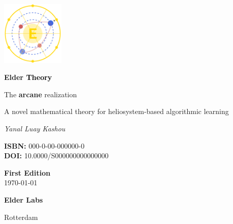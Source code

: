 \documentclass[11pt,twoside]{book}
\begin{document}
\frontmatter

\begin{titlepage}
    \centering
    \vspace*{0.5cm}
    \includegraphics[width=3cm]{figures/elder_symbol.pdf}
    \vspace{0.5cm}
    
    {\Huge\bfseries \textcolor{DarkSkyBlue}{Elder }\textrm{\textcolor{black}{Theory}}\par}
    \vspace{0.8cm}
    {\Large The \textcolor{DarkSkyBlue}{\textbf{arcane}} realization\par}
    \vspace{0.3cm}
    {\large A novel mathematical theory for heliosystem-based algorithmic learning\par}
    
    \vspace{3cm}
    {\Large\itshape Yanal Luay Kashou\par}

    \vfill
    
    \begin{minipage}{0.4\textwidth}
        \begin{flushleft}
            \textbf{ISBN:} 000-0-00-000000-0 \\
            \textbf{DOI:} 10.0000/S000000000000000
        \end{flushleft}
    \end{minipage}%
    \begin{minipage}{0.4\textwidth}
        \begin{flushright}
            \textbf{First Edition} \\
            \today
        \end{flushright}
    \end{minipage}
    
    \vspace{1cm}
    {\large \textbf{Elder Labs}\par}
    {\small Rotterdam\par}
\end{titlepage}
\end{document}
